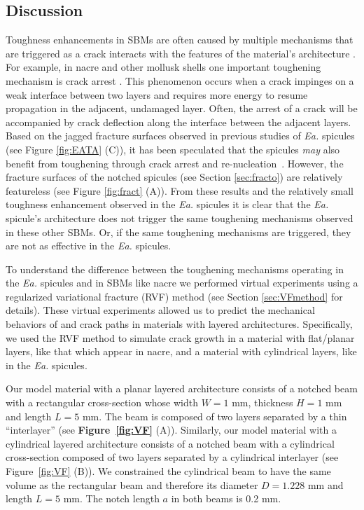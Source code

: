 \documentclass[12pt,onecolumn]{article}
\makeatletter
\newcommand{\EA}{\textit{Ea.\@}\xspace}
\makeatother
\begin{document}
\begin{bibunit}
\section{Discussion}
\label{sec:discussion}
Toughness enhancements in SBMs are often caused by multiple mechanisms that are triggered as a crack interacts with the features of the material's architecture \cite{barthelat2007experimental,currey1977,launey2009fracture}. For example, in nacre and other mollusk shells one important toughening mechanism is crack arrest \cite{jackson1988mechanical,currey1977,kamat2000structural}. This phenomenon occurs when a crack impinges on a weak interface between two layers and requires more energy to resume propagation in the adjacent, undamaged layer. Often, the arrest of a crack will be accompanied by crack deflection along the interface between the adjacent layers. Based on the jagged fracture surfaces observed in previous studies of \EA spicules (see Figure \ref{fig:EATA} (C)), it has been speculated that the spicules \emph{may} also benefit from toughening through crack arrest and re-nucleation~\cite{mayer2011new,walter2007mechanisms}. However, the fracture surfaces of the notched spicules (see Section \ref{sec:fracto}) are relatively featureless (see Figure \ref{fig:fract} (A)). From these results and the relatively small toughness enhancement observed in the \EA spicules it is clear that the \EA spicule's architecture does not trigger the same toughening mechanisms observed in these other SBMs. Or, if the same toughening mechanisms are triggered, they are not as effective in the \EA spicules.

To understand the difference between the toughening mechanisms operating in the \EA spicules and in SBMs like nacre we performed virtual experiments using a regularized variational fracture (RVF) method (see Section \ref{sec:VFmethod} for details). These virtual experiments allowed us to predict the  mechanical behaviors of and crack paths in materials with layered architectures. Specifically, we used the RVF method to simulate crack growth in a material with flat/planar layers, like that which appear in nacre, and a material with cylindrical layers, like in the \EA spicules.

Our model material with a planar layered architecture consists of a notched beam with a rectangular cross-section whose width $W=1$ mm, thickness $H=1$ mm and length $L=5$ mm. The beam is composed of two layers separated by a thin ``interlayer'' (see {\bf Figure~\ref{fig:VF}} (A)). Similarly, our model material with a cylindrical layered architecture consists of a notched beam with a cylindrical cross-section composed of two layers separated by a cylindrical interlayer (see Figure~\ref{fig:VF} (B)). We constrained the cylindrical beam to have the same volume as the rectangular beam and therefore its diameter $D=1.228$ mm and length $L=5$ mm. The notch length $a$ in both beams is 0.2 mm.


\end{bibunit}
\end{document}
